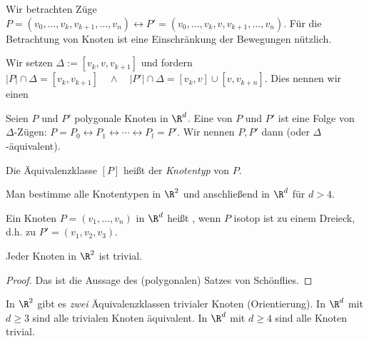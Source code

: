 Wir betrachten Züge
\begin{math}
    P = (v_0, \dotsc, v_k, v_{k+1}, \dotsc, v_n)
    \leftrightarrow
    P' = (v_0, \dotsc, v_k, v, v_{k+1}, \dotsc, v_n).
\end{math}
Für die Betrachtung von Knoten ist eine Einschränkung der Bewegungen nützlich.

Wir setzen $\Delta := [v_k, v, v_{k+1}]$ und fordern
\begin{math}
    |P| \cap \Delta = [v_k, v_{k+1}]
    \quad \land \quad
    |P'| \cap \Delta = [v_k, v] \cup [v, v_{k+n}].
\end{math}
Dies nennen wir einen 


\begin{df}
    Seien $P$ und $P'$ polygonale Knoten in $\R^d$.
    Eine  von $P$ und $P'$ ist eine Folge von $\Delta$-Zügen:
    \begin{math}
        P = P_0 \leftrightarrow P_1 \leftrightarrow \dotsb \leftrightarrow P_l = P'.
    \end{math}
    Wir nennen $P, P'$ dann  (oder $\Delta$-äquivalent).

    Die Äquivalenzklasse $[P]$ heißt der \emph{Knotentyp} von $P$.
\end{df}



\begin{ex}
    Man bestimme alle Knotentypen in $\R^2$ und anschließend in $\R^d$ für $d > 4$.
\end{ex}

\begin{df}
    Ein Knoten $P = (v_1, \dotsc, v_n)$ in $\R^d$ heißt , wenn $P$ isotop ist zu einem Dreieck, d.h. zu $P' = (v_1,v_2,v_3)$.
\end{df}

\begin{prop}
    Jeder Knoten in $\R^2$ ist trivial.
    \begin{proof}
        Das ist die Aussage des (polygonalen) Satzes von Schönflies.
    \end{proof}
\end{prop}

\begin{note}
    In $\R^2$ gibt es \emph{zwei} Äquivalenzklassen trivialer Knoten (Orientierung).
    In $\R^d$ mit $d \ge 3$ sind alle trivialen Knoten äquivalent.
    In $\R^d$ mit $d \ge 4$ sind alle Knoten trivial.
\end{note}

